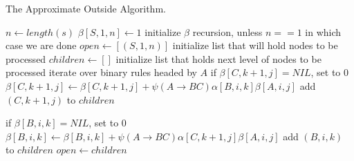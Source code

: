 \documentclass{article}
\begin{document}
\begin{algorithm}
\caption{The Approximate Outside Algorithm.\label{alg:approxOutside}}
\begin{algorithmic}[2]
  \State $n \leftarrow length(s)$
  \State $\beta[S, 1, n] \leftarrow 1$ \Comment initialize $\beta$ recursion, unless $n==1$ in which case we are done
  \State $open \leftarrow [(S, 1, n)]$ \Comment initialize list that will hold nodes to be processed
  \State $children \leftarrow []$ \Comment initialize list that holds next level of nodes to be processed
     \Comment iterate over binary rules headed by $A$
          \State if $\beta[C, k+1, j] = NIL$, set to $0$
          \State $\beta[C, k+1, j] \leftarrow \beta[C, k+1, j] + \psi(A \rightarrow B C) \alpha[B, i, k] \beta[A, i, j]$
          \State add $(C, k+1, j)$ to $children$
        \EndIf 

          \State if $\beta[B, i, k] = NIL$, set to $0$
          \State $\beta[B, i, k] \leftarrow \beta[B, i, k] + \psi(A \rightarrow B C) \alpha[C, k+1, j] \beta[A, i, j]$
          \State add $(B, i, k)$ to $children$
        \EndIf 
      \EndFor 
   \EndFor
   \EndFor
   \State $open \leftarrow children$
  \EndWhile    
\EndProcedure
\end{algorithmic}
\end{algorithm}
\end{document}
